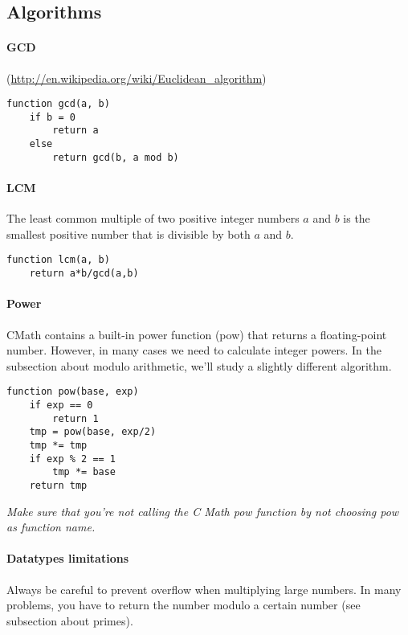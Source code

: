 \subsection{Algorithms}
\paragraph{GCD}

(\url{http://en.wikipedia.org/wiki/Euclidean_algorithm})
\begin{lstlisting}
function gcd(a, b)
    if b = 0
       	return a
    else
	    return gcd(b, a mod b)
\end{lstlisting}

\paragraph{LCM}
The least common multiple of two positive integer numbers $a$ and $b$ is the smallest positive number that is divisible by both $a$ and $b$.
\begin{lstlisting}
function lcm(a, b)
	return a*b/gcd(a,b)
\end{lstlisting}

\paragraph{Power}
CMath contains a built-in power function (pow) that returns a floating-point number. However, in many cases we need to calculate integer powers.
In the subsection about modulo arithmetic, we'll study a slightly different algorithm.
\begin{lstlisting}
function pow(base, exp)
	if exp == 0
		return 1
	tmp = pow(base, exp/2)
	tmp *= tmp
	if exp % 2 == 1
		tmp *= base
	return tmp
\end{lstlisting}
\emph{Make sure that you're not calling the C Math pow function by not choosing pow as function name.}

\paragraph{Datatypes limitations} Always be careful to prevent overflow when multiplying large numbers. In many problems, you have to return the number modulo a certain number (see subsection about primes).
